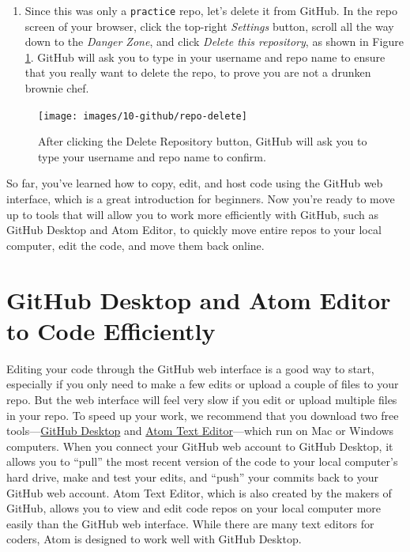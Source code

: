 \documentclass[
  english,
]{book}
\providecommand{\tightlist}{%
  \setlength{\itemsep}{0pt}\setlength{\parskip}{0pt}}
\begin{document}
\begin{enumerate}
\def\labelenumi{\arabic{enumi}.}
\setcounter{enumi}{6}
\tightlist
\item
  Since this was only a \texttt{practice} repo, let's delete it from GitHub. In the repo screen of your browser, click the top-right \emph{Settings} button, scroll all the way down to the \emph{Danger Zone}, and click \emph{Delete this repository}, as shown in Figure \ref{fig:repo-delete}. GitHub will ask you to type in your username and repo name to ensure that you really want to delete the repo, to prove you are not a drunken brownie chef.
\end{enumerate}



\begin{figure}
\texttt{[image: images/10-github/repo-delete]} \caption{After clicking the Delete Repository button, GitHub will ask you to type your username and repo name to confirm.}\label{fig:repo-delete}
\end{figure}

So far, you've learned how to copy, edit, and host code using the GitHub web interface, which is a great introduction for beginners. Now you're ready to move up to tools that will allow you to work more efficiently with GitHub, such as GitHub Desktop and Atom Editor, to quickly move entire repos to your local computer, edit the code, and move them back online.

\hypertarget{github-desktop-atom}{%
\section*{GitHub Desktop and Atom Editor to Code Efficiently}\label{github-desktop-atom}}

Editing your code through the GitHub web interface is a good way to start, especially if you only need to make a few edits or upload a couple of files to your repo. But the web interface will feel very slow if you edit or upload multiple files in your repo. To speed up your work, we recommend that you download two free tools---\href{https://desktop.github.com}{GitHub Desktop} and \href{https://atom.io}{Atom Text Editor}---which run on Mac or Windows computers. When you connect your GitHub web account to GitHub Desktop, it allows you to ``pull'' the most recent version of the code to your local computer's hard drive, make and test your edits, and ``push'' your commits back to your GitHub web account. Atom Text Editor, which is also created by the makers of GitHub, allows you to view and edit code repos on your local computer more easily than the GitHub web interface. While there are many text editors for coders, Atom is designed to work well with GitHub Desktop.
\end{document}

